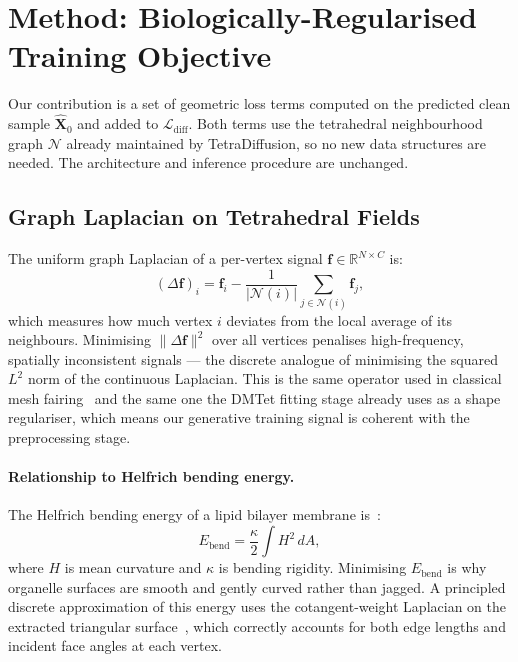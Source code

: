 \documentclass[10pt, a4paper, twocolumn]{article}
\begin{document}
\section{Method: Biologically-Regularised Training Objective}
\label{sec:method}

Our contribution is a set of geometric loss terms computed on the predicted clean sample $\hat{\mathbf{X}}_0$ and added to $\mathcal{L}_{\text{diff}}$. Both terms use the tetrahedral neighbourhood graph $\mathcal{N}$ already maintained by TetraDiffusion, so no new data structures are needed. The architecture and inference procedure are unchanged.

\subsection{Graph Laplacian on Tetrahedral Fields}

The uniform graph Laplacian of a per-vertex signal $\mathbf{f} \in \mathbb{R}^{N \times C}$ is:
\begin{equation}
    (\Delta \mathbf{f})_i = \mathbf{f}_i - \frac{1}{|\mathcal{N}(i)|} \sum_{j \in \mathcal{N}(i)} \mathbf{f}_j,
\end{equation}
which measures how much vertex $i$ deviates from the local average of its neighbours. Minimising $\|\Delta \mathbf{f}\|^2$ over all vertices penalises high-frequency, spatially inconsistent signals — the discrete analogue of minimising the squared $L^2$ norm of the continuous Laplacian. This is the same operator used in classical mesh fairing~\cite{desbrun1999implicit} and the same one the DMTet fitting stage already uses as a shape regulariser, which means our generative training signal is coherent with the preprocessing stage.

\paragraph{Relationship to Helfrich bending energy.}
The Helfrich bending energy of a lipid bilayer membrane is~\cite{helfrich1973elastic}:
\begin{equation}
    E_{\text{bend}} = \frac{\kappa}{2} \int H^2 \, dA,
\end{equation}
where $H$ is mean curvature and $\kappa$ is bending rigidity. Minimising $E_{\text{bend}}$ is why organelle surfaces are smooth and gently curved rather than jagged. A principled discrete approximation of this energy uses the cotangent-weight Laplacian on the extracted triangular surface~\cite{desbrun1999implicit}, which correctly accounts for both edge lengths and incident face angles at each vertex.
\end{document}
